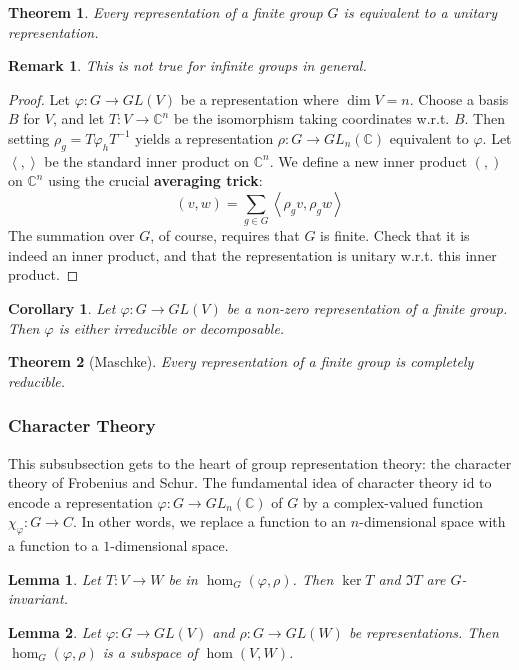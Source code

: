 \documentclass{article}
\newtheorem{Thm}{Theorem}[section]
\newtheorem{corollary}{Corollary}[Thm]
\newtheorem{Lem}{Lemma}[section]
\newtheorem*{Rk}{Remark}
\theoremstyle{definition}
\begin{document}
\begin{Thm}
    Every representation of a finite group $G$ is equivalent to a unitary representation.
\end{Thm}
\begin{Rk}
    This is not true for infinite groups in general.
\end{Rk}
\begin{proof}
    Let $\varphi:G\to GL(V)$ be a representation where $\dim V=n$. Choose a basis $B$ for $V$, and let $T:V\to \mathbb{C}^n$ be the isomorphism taking coordinates w.r.t. $B$.
Then setting $\rho_g=T\varphi_hT^{-1}$ yields a representation $\rho:G\to GL_n(\mathbb{C})$ equivalent to $\varphi$. Let $\left\langle,\right\rangle$ be the standard inner product on $\mathbb{C}^n$.
We define a new inner product $(,)$ on $\mathbb{C}^n$ using the crucial \textbf{averaging trick}:
\[(v,w)=\sum_{g\in G}\left\langle\rho_gv,\rho_gw\right\rangle\]
The summation over $G$, of course, requires that $G$ is finite. Check that it is indeed an inner product, and that the representation is unitary w.r.t. this inner product. 
\end{proof}
\begin{corollary}
Let $\varphi:G\to GL(V)$ be a non-zero representation of a finite group. Then $\varphi$ is either irreducible or decomposable.
\end{corollary}

\begin{Thm}[Maschke]
    Every representation of a finite group is completely reducible.
\end{Thm}

\subsubsection{Character Theory}
This subsubsection gets to the heart of group representation theory: the character theory of Frobenius and Schur.
The fundamental idea of character theory id to encode a representation $\varphi:G\to GL_n(\mathbb{C})$ of $G$ by a complex-valued function $\chi_\varphi:G\to C$.
In other words, we replace a function to an $n$-dimensional space with a function to a $1$-dimensional space.
\begin{Lem}
    Let $T:V\to W$ be in $\hom_G(\varphi,\rho)$. Then $\ker T$ and $\Im T$ are $G$-invariant.
\end{Lem}

\begin{Lem}
    Let $\varphi:G\to GL(V)$ and $\rho:G\to GL(W)$ be representations. Then $\hom_G(\varphi,\rho)$ is a subspace of $\hom(V,W)$.
\end{Lem}
\end{document}
